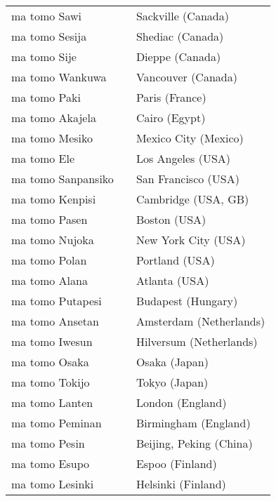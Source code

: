 \begin{supertabular}{p{4,5cm}|ll}
    ma tomo Sawi                      &  & Sackville (Canada)        \\
    ma tomo Sesija                    &  & Shediac (Canada)          \\
    ma tomo Sije                      &  & Dieppe (Canada)           \\
    ma tomo Wankuwa                   &  & Vancouver (Canada)        \\
    ma tomo Paki                      &  & Paris (France)            \\
    ma tomo Akajela                   &  & Cairo (Egypt)             \\
    ma tomo Mesiko                    &  & Mexico City (Mexico)      \\
    ma tomo Ele                       &  & Los Angeles (USA)         \\
    ma tomo Sanpansiko                &  & San Francisco (USA)       \\
    ma tomo Kenpisi                   &  & Cambridge (USA, GB)       \\
    ma tomo Pasen                     &  & Boston (USA)              \\
    ma tomo Nujoka                    &  & New York City (USA)       \\
    ma tomo Polan                     &  & Portland (USA)            \\
    ma tomo Alana                     &  & Atlanta (USA)             \\
    ma tomo Putapesi                  &  & Budapest (Hungary)        \\
    ma tomo Ansetan                   &  & Amsterdam (Netherlands)   \\
    ma tomo Iwesun                    &  & Hilversum (Netherlands)   \\
    ma tomo Osaka                     &  & Osaka (Japan)             \\
    ma tomo Tokijo                    &  & Tokyo (Japan)             \\
    ma tomo Lanten                    &  & London (England)          \\
    ma tomo Peminan                   &  & Birmingham (England)      \\
    ma tomo Pesin                     &  & Beijing, Peking (China)   \\
    ma tomo Esupo                     &  & Espoo (Finland)           \\
    ma tomo Lesinki                   &  & Helsinki (Finland)        \\

\end{supertabular}
